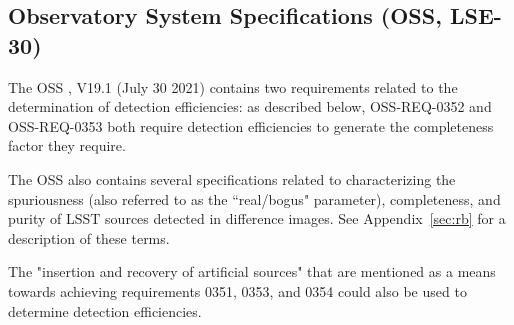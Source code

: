 \subsection{Observatory System Specifications (OSS, LSE-30)}\label{ssec:docs_oss}

The OSS , V19.1 (July 30 2021) contains two requirements related to the determination of detection efficiencies: as described below, OSS-REQ-0352 and OSS-REQ-0353 both require detection efficiencies to generate the completeness factor they require.

The OSS also contains several specifications related to characterizing the spuriousness (also referred to as the ``real/bogus" parameter), completeness, and purity of LSST sources detected in difference images.
See Appendix~\ref{sec:rb} for a description of these terms.

The "insertion and recovery of artificial sources" that are mentioned as a means towards achieving requirements 0351, 0353, and 0354 could also be used to determine detection efficiencies.

